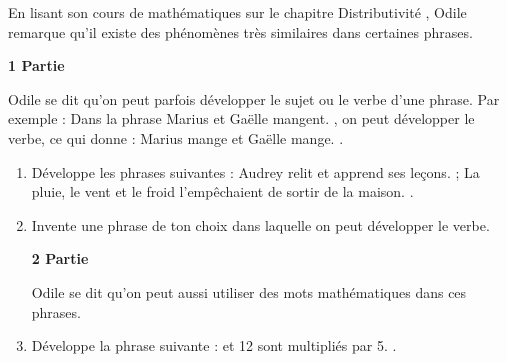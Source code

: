 \begin{activite}
\end{activite}
 




\begin{activite}
En lisant son cours de mathématiques sur le chapitre \og Distributivité \fg, Odile remarque qu'il existe des phénomènes très similaires dans certaines phrases.

\vspace{1em}\textbf{1 Partie}\vspace{1em}

Odile se dit qu'on peut parfois développer le sujet ou le verbe d'une phrase. 
Par exemple : Dans la phrase \og Marius et Gaëlle mangent. \fg, on peut développer le verbe, ce qui donne : \og Marius mange et Gaëlle mange. \fg.

\begin{enumerate}
\item Développe les phrases suivantes :
\og Audrey relit et apprend ses leçons. \fg ;
\og La pluie, le vent et le froid l'empêchaient de sortir de la maison. \fg.
\item Invente une phrase de ton choix dans laquelle on peut développer le verbe.

\vspace{1em}\textbf{2 Partie}\vspace{1em}

Odile se dit qu'on peut aussi utiliser des mots mathématiques dans ces phrases.

\item Développe la phrase suivante :  et 12 sont multipliés par 5. \fg.
\end{enumerate}
\end{activite}
 







